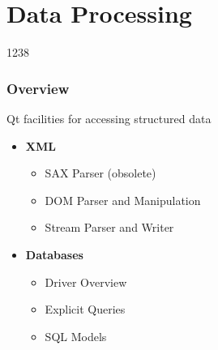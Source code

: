 %
%
%
%

\section{Data Processing}

\begin{slide}{1238}\label{data-processing}
\frametitle{Overview}

Qt facilities for accessing structured data

\begin{itemize}
\item \textbf{XML}
  \begin{itemize}
  \item SAX Parser (obsolete)
  \item DOM Parser and Manipulation
  \item Stream Parser and Writer
  \end{itemize}
\item \textbf{Databases}
  \begin{itemize}
  \item Driver Overview
  \item Explicit Queries
  \item SQL Models
  \end{itemize}
\end{itemize}
\end{slide}




%
%
